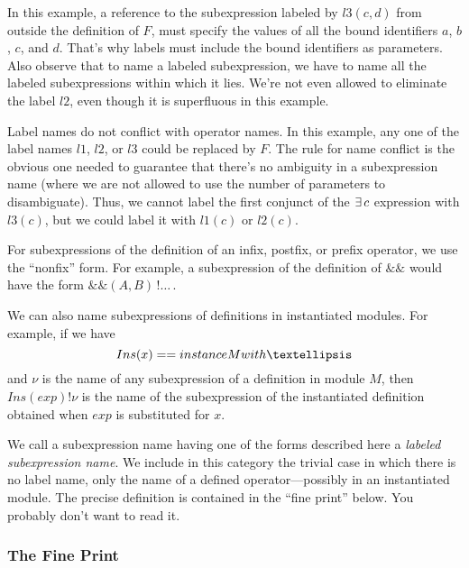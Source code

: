\documentclass[fleqn,leqno]{article}
\begin{document}
In this example, a reference to the subexpression labeled by $l3(c,d)$
from outside the definition of $F$, must specify the values of all the
bound identifiers $a$, $b$, $c$, and $d$.  That's why labels must
include the bound identifiers as parameters.  Also observe that to
name a labeled subexpression, we have to name all the labeled
subexpressions within which it lies.  We're not even allowed to
eliminate the label $l2$, even though it is superfluous in this
example.

Label names do not conflict with operator names.  In this example, any
one of the label names $l1$, $l2$, or $l3$ could be replaced by $F$.
The rule for name conflict is the obvious one needed to guarantee that
there's no ambiguity in a subexpression name (where we are not allowed
to use the number of parameters to disambiguate).  Thus, we cannot
label the first conjunct of the $\exists\,c$ expression with $l3(c)$, but
we could label it with $l1(c)$ or $l2(c)$.

For subexpressions of the definition of an infix, postfix, or prefix
operator, we use the ``nonfix'' form.  For example, a subexpression of
the definition of $\&\&$ would have the form $\&\&(A, B)\,!\ldots$\,.

We can also name subexpressions of definitions in instantiated modules.
For example, if we have
 \[ Ins(x) == \INSTANCE M \WITH \ldots
 \]
and $\nu$ is the name of any subexpression of a definition in module
$M$, then $Ins(exp)!\nu$ is the name of the subexpression of the
instantiated definition obtained when $exp$ is substituted for $x$.

We call a subexpression name having one of the forms described here a
\emph{labeled subexpression name}.  We include in this category the
trivial case in which there is no label name, only the name of a
defined operator---possibly in an instantiated module.  The precise
definition is contained in the ``fine print'' below.  You probably
don't want to read it.


\subsubsection*{The Fine Print}
\end{document}
